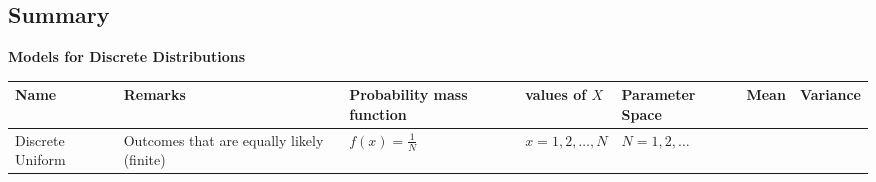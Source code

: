 \documentclass[]{book}
\begin{document}
\newpage
{}
\begin{landscape}

\hypertarget{summary}{%
\section*{Summary}\label{summary}}

\textbf{Models for Discrete Distributions}

\begin{longtable}[]{@{}lllllll@{}}
\toprule
\begin{minipage}[b]{0.10\columnwidth}\raggedright
Name\strut
\end{minipage} & \begin{minipage}[b]{0.13\columnwidth}\raggedright
Remarks\strut
\end{minipage} & \begin{minipage}[b]{0.16\columnwidth}\raggedright
Probability mass function\strut
\end{minipage} & \begin{minipage}[b]{0.14\columnwidth}\raggedright
values of \(X\)\strut
\end{minipage} & \begin{minipage}[b]{0.16\columnwidth}\raggedright
Parameter Space\strut
\end{minipage} & \begin{minipage}[b]{0.05\columnwidth}\raggedright
Mean\strut
\end{minipage} & \begin{minipage}[b]{0.09\columnwidth}\raggedright
Variance\strut
\end{minipage}\tabularnewline
\midrule
\endhead
\begin{minipage}[t]{0.10\columnwidth}\raggedright
Discrete Uniform\strut
\end{minipage} & \begin{minipage}[t]{0.13\columnwidth}\raggedright
Outcomes that are equally likely (finite)\strut
\end{minipage} & \begin{minipage}[t]{0.16\columnwidth}\raggedright
\(f(x) = \frac{1}{N}\)\strut
\end{minipage} & \begin{minipage}[t]{0.14\columnwidth}\raggedright
\(x=1,2,\dots, N\)\strut
\end{minipage} & \begin{minipage}[t]{0.16\columnwidth}\raggedright
\(N=1,2,\dots\)\strut

\end{minipage}
\end{longtable}
\end{landscape}
\end{document}
